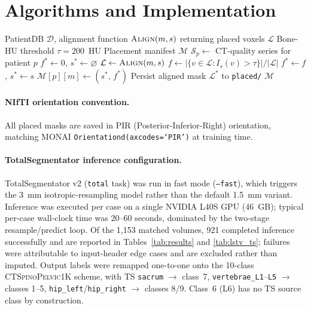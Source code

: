 \documentclass[pmlr]{jmlr}
\newcommand{\dataset}{\textsc{CTSpinoPelvic1K}}
\begin{document}
\section{Algorithms and Implementation}
\label{app:algorithm}

\begin{algorithm}[h]
\caption{Phase~2: Intrapatient Exhaustive Series Assignment}
\label{alg:phase2}
\begin{algorithmic}[1]
\REQUIRE PatientDB $\mathcal{D}$, alignment function
  $\textsc{Align}(m, s)$ returning placed voxels $\mathcal{L}$
\REQUIRE Bone-HU threshold $\tau = 200$~HU
\ENSURE Placement manifest $\mathcal{M}$
  \STATE $\mathcal{S}_p \leftarrow$ CT-quality series for patient $p$
    \STATE $f^* \leftarrow 0$, $s^* \leftarrow \varnothing$
      \STATE $\mathcal{L} \leftarrow \textsc{Align}(m, s)$
      \STATE $f \leftarrow
        |\{v \in \mathcal{L} : I_s(v) > \tau\}| / |\mathcal{L}|$
        \STATE $f^* \leftarrow f$,\; $s^* \leftarrow s$
      \ENDIF
    \ENDFOR
    \STATE $\mathcal{M}[p][m] \leftarrow (s^*,\, f^*)$
    \STATE Persist aligned mask $\mathcal{L}^*$ to \texttt{placed/}
  \ENDFOR
\ENDFOR
\RETURN $\mathcal{M}$
\end{algorithmic}
\end{algorithm}

\paragraph{NIfTI orientation convention.}
All placed masks are saved in PIR (Posterior-Inferior-Right)
orientation, matching MONAI \texttt{Orientationd(axcodes=`PIR')}
at training time.

\paragraph{TotalSegmentator inference configuration.}
TotalSegmentator v2 (\texttt{total} task) was run in fast mode
(\texttt{--fast}), which triggers the 3~mm isotropic-resampling
model rather than the default 1.5~mm variant.
Inference was executed per case on a single NVIDIA L40S GPU
(46~GB); typical per-case wall-clock time was 20--60 seconds,
dominated by the two-stage resample/predict loop.
Of the 1{,}153 matched volumes, 921 completed inference
successfully and are reported in Tables~\ref{tab:results} and
\ref{tab:lstv_ts}; failures were attributable to input-header
edge cases and are excluded rather than imputed.
Output labels were remapped one-to-one onto the 10-class
\dataset{} scheme, with TS \texttt{sacrum} $\rightarrow$ class~7,
\texttt{vertebrae\_L1}--\texttt{L5} $\rightarrow$ classes 1--5,
\texttt{hip\_left}/\texttt{hip\_right} $\rightarrow$ classes 8/9.
Class~6 (L6) has no TS source class by construction.
\end{document}
